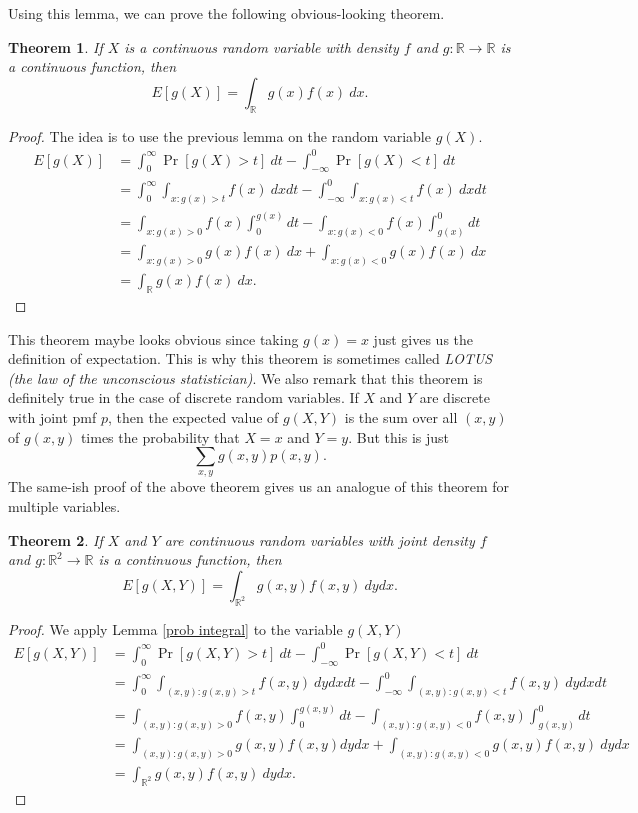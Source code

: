 \documentclass[12pt]{article}
\theoremstyle{plain}
\newtheorem{theorem}{Theorem}[section]
\theoremstyle{definition}
\theoremstyle{remark}
\newcommand{\R}{\mathbb{R}}
\begin{document}
Using this lemma, we can prove the following obvious-looking theorem.

\begin{theorem}\label{LOTUS 1var}
    If $X$ is a continuous random variable with density $f$ and $g:\R\to \R$ is a continuous function, then
    \[
        E[g(X)] = \int_\R g(x)f(x)\ dx.
    \]
\end{theorem}

\begin{proof}
    The idea is to use the previous lemma on the random variable $g(X)$.
    \begin{align*}
        E[g(X)] &= \int_0^\infty \Pr[g(X) > t]\ dt - \int_{-\infty}^0 \Pr[g(X) < t]\ dt\\
        &= \int_0^\infty \int_{x: g(x)>t}f(x)\ dxdt - \int_{-\infty}^0 \int_{x: g(x)<t}f(x)\ dxdt\\
        &= \int_{x: g(x)>0}f(x)\int_0^{g(x)}dt - \int_{x: g(x)<0}f(x)\int_{g(x)}^0dt\\
        &= \int_{x: g(x)>0}g(x)f(x)\ dx + \int_{x: g(x)<0}g(x)f(x)\ dx\\
        &= \int_\R g(x)f(x)\ dx.
    \end{align*}
\end{proof}

This theorem maybe looks obvious since taking $g(x) = x$ just gives us the definition of expectation.
This is why this theorem is sometimes called \emph{LOTUS (the law of the unconscious statistician)}.
We also remark that this theorem is definitely true in the case of discrete random variables.
If $X$ and $Y$ are discrete with joint pmf $p$, then the expected value of $g(X,Y)$ is the sum over all $(x,y)$ of $g(x,y)$ times the probability that $X=x$ and $Y = y$.
But this is just
\[
    \sum_{x,y}g(x,y)p(x,y).
\]
The same-ish proof of the above theorem gives us an analogue of this theorem for multiple variables.

\begin{theorem}\label{LOTUS multivar}
    If $X$ and $Y$ are continuous random variables with joint density $f$ and $g:\R^2\to \R$ is a continuous function, then
    \[
        E[g(X,Y)] = \int_{\R^2} g(x,y)f(x,y)\ dydx.
    \]
\end{theorem}

\begin{proof}
    We apply Lemma \ref{prob integral} to the variable $g(X,Y)$
    \begin{align*}
        E[g(X,Y)] &= \int_0^\infty \Pr[g(X,Y) > t]\ dt - \int_{-\infty}^0 \Pr[g(X,Y) < t]\ dt\\
        &= \int_0^\infty \int_{(x,y): g(x,y)>t}f(x,y)\ dydxdt - \int_{-\infty}^0 \int_{(x,y): g(x,y)<t}f(x,y)\ dydxdt\\
        &= \int_{(x,y): g(x,y)>0}f(x,y)\int_0^{g(x,y)}dt - \int_{(x,y): g(x,y)<0}f(x,y)\int_{g(x,y)}^0dt\\
        &= \int_{(x,y): g(x,y)>0}g(x,y)f(x,y) dydx + \int_{(x,y): g(x,y)<0}g(x,y)f(x,y)\ dydx\\
        &= \int_{\R^2} g(x,y)f(x,y)\ dydx.
    \end{align*}
\end{proof}
\end{document}
